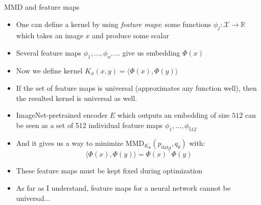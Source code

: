 \documentclass[handout, 10pt]{beamer}
\begin{document}
\begin{frame}{MMD and feature maps}
\begin{itemize}
    \item\pause One can define a kernel by using \textit{feature maps}: some functions $\phi_j: \mathcal{X} \to \mathbb{R}$ which takes an image $x$ and produce some scalar
    \item\pause Several feature maps $\phi_1, ..., \phi_n, ...$ give us embedding $\Phi(x)$
    \item\pause Now we define kernel $K_\phi(x,y) = \langle \Phi(x), \Phi(y) \rangle$
    \item\pause If the set of feature maps is universal (approximates any function well), then the resulted kernel is universal as well.
    \item\pause ImageNet-pretrained encoder $E$ which outputs an embedding of size $512$ can be seen as a set of 512 individual feature maps $\phi_1, ..., \phi_{512}$
    \item\pause And it gives us a way to minimize $\text{MMD}_{K_\Phi}(p_\text{data}, q_\theta)$ with:
\[
\langle \Phi(x), \Phi(y) \rangle = \Phi(x)^\top \Phi(y)
\]
    \item\pause These feature maps must be kept fixed during optimization
    \item\pause As far as I understand, feature maps for a neural network cannot be universal...
\end{itemize}
\end{frame}
\end{document}
